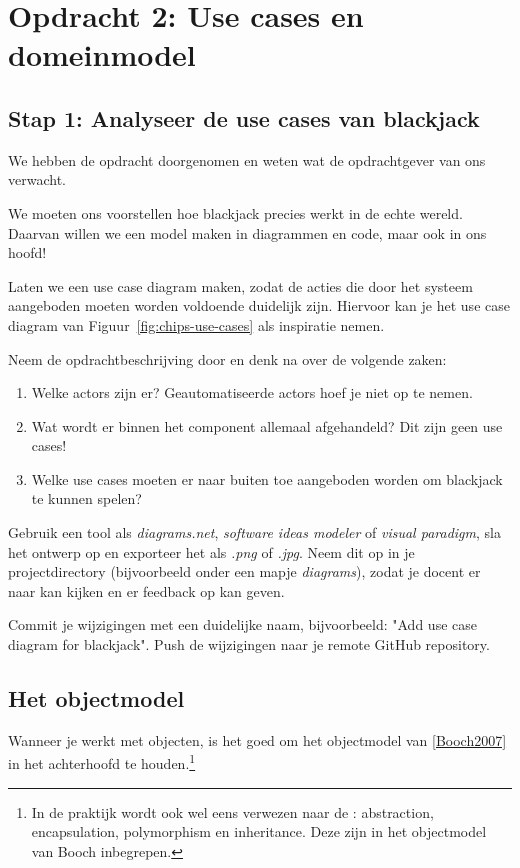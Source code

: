 \chapter{Opdracht 2: Use cases en domeinmodel}

\section{Stap 1: Analyseer de use cases van blackjack}
We hebben de opdracht doorgenomen en weten wat de opdrachtgever van ons verwacht.

We moeten ons voorstellen hoe blackjack precies werkt in de echte wereld.
Daarvan willen we een model maken in diagrammen en code, maar ook in ons hoofd!

Laten we een use case diagram maken, zodat de acties die door het systeem
aangeboden moeten worden voldoende duidelijk zijn. Hiervoor kan je het use case 
diagram van Figuur~\ref{fig:chips-use-cases} als inspiratie nemen.

Neem de opdrachtbeschrijving door en denk na over de volgende zaken:
\begin{enumerate}
    \item Welke actors zijn er? Geautomatiseerde actors hoef je niet op te nemen.
    \item Wat wordt er binnen het component allemaal afgehandeld? Dit zijn geen use cases!
    \item Welke use cases moeten er naar buiten toe aangeboden worden om blackjack te kunnen spelen?
\end{enumerate}

Gebruik een tool als \textit{diagrams.net}, \textit{software ideas modeler} of \textit{visual paradigm},
sla het ontwerp op en exporteer het als \textit{.png} of \textit{.jpg}. 
Neem dit op in je projectdirectory (bijvoorbeeld onder een mapje \textit{diagrams}),
zodat je docent er naar kan kijken en er feedback op kan geven.

Commit je wijzigingen met een duidelijke naam, 
bijvoorbeeld: "Add use case diagram for blackjack". 
Push de wijzigingen naar je remote GitHub repository.

\section{Het objectmodel}
Wanneer je werkt met objecten, is het goed om het objectmodel van \ref{Booch2007} in 
het achterhoofd te houden.\footnote{
    In de praktijk wordt ook wel eens verwezen naar de : 
    abstraction, encapsulation, polymorphism en inheritance. 
    Deze zijn in het objectmodel van Booch inbegrepen.
}

